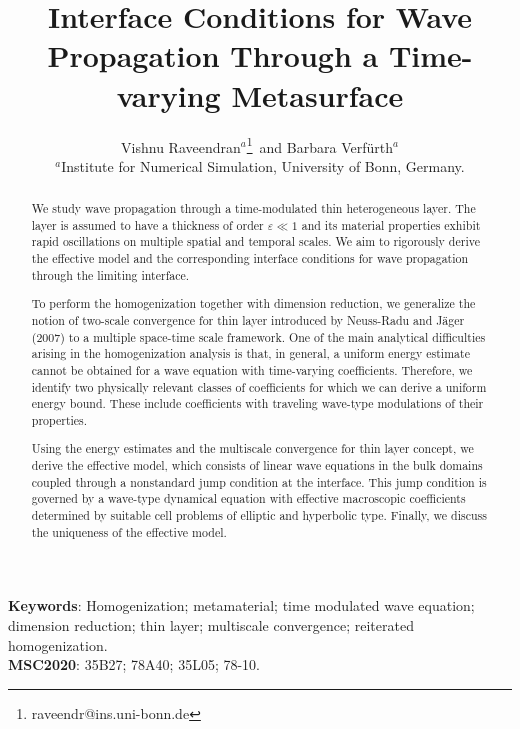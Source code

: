\documentclass[11pt]{article}
\def\es{\varepsilon}
\begin{document}
	
	
	\title{Interface Conditions for Wave Propagation Through a Time-varying Metasurface}


\author{Vishnu Raveendran$^a$\footnote{raveendr@ins.uni-bonn.de}\,  and Barbara Verfürth$^a$ \\ 
$^a$Institute for Numerical Simulation, University of Bonn, Germany.}


	
	\date{} %
	\maketitle
	
	\begin{abstract}\label{abstract}
    
	 We study wave propagation through a time-modulated thin heterogeneous layer.  The layer is assumed to have a thickness  of order $\es\ll 1$ and its material properties exhibit rapid oscillations on multiple spatial and temporal scales.
We aim to rigorously derive the effective model and the corresponding interface conditions for wave propagation through the limiting interface. 
 
To perform the homogenization together with dimension reduction, we generalize the notion of two-scale convergence for thin layer introduced by Neuss-Radu and Jäger (2007) to a multiple space-time scale framework. One of the main analytical difficulties arising in the homogenization analysis is that, in general, a uniform energy estimate cannot be obtained for a wave equation with time-varying coefficients. Therefore, we identify two physically relevant classes of coefficients for which we can derive a uniform energy bound. These include coefficients with traveling wave-type modulations of their properties.

Using the energy estimates and the multiscale convergence for thin layer concept, we derive the effective model, which  consists of linear wave equations in the bulk domains coupled through a nonstandard jump condition at the interface. This jump condition is governed by a wave-type dynamical equation with effective macroscopic coefficients determined by suitable cell problems of elliptic and hyperbolic type.  Finally, we discuss the uniqueness of the effective model. 
     
	\end{abstract}
		{\bf Keywords}: Homogenization; metamaterial; time modulated wave equation; dimension reduction; thin layer; multiscale convergence; reiterated homogenization.
		\\
		{\bf MSC2020}: 35B27; 78A40; 35L05; 78-10.    
\maketitle
\end{document}
